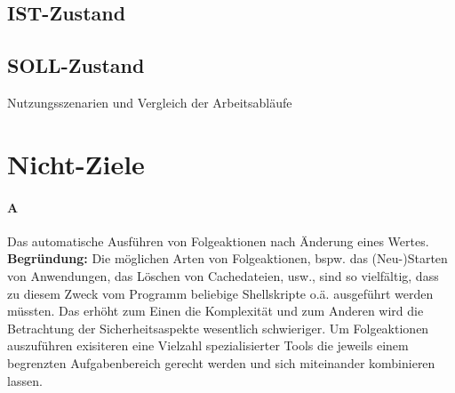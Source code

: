 \documentclass[a4paper,11pt]{article}
\begin{document}
\subsection{IST-Zustand}
\subsection{SOLL-Zustand}

\begin{center}
	\begin{table}[h]
		\caption{Nutzungsszenarien und Vergleich der Arbeitsabläufe}
	\end{table}
\end{center}

\section{Nicht-Ziele}
\paragraph{A}
Das automatische Ausführen von Folgeaktionen nach Änderung eines Wertes. \textbf{Begründung:}
Die möglichen Arten von Folgeaktionen, bspw. das (Neu-)Starten von Anwendungen,
das Löschen von Cachedateien, usw., sind so vielfältig, dass zu diesem Zweck vom
Programm beliebige Shellskripte o.ä. ausgeführt werden müssten. Das erhöht zum Einen
die Komplexität und zum Anderen wird die Betrachtung der Sicherheitsaspekte
wesentlich schwieriger. Um Folgeaktionen auszuführen exisiteren eine Vielzahl
spezialisierter Tools die jeweils einem begrenzten Aufgabenbereich gerecht werden
und sich miteinander kombinieren lassen.
\end{document}

